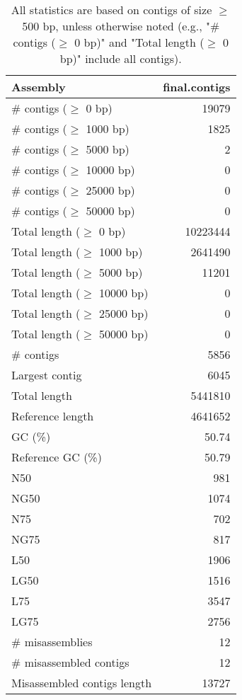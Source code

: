 \documentclass[12pt,a4paper]{article}
\begin{document}
\begin{table}[ht]
\begin{center}
\caption{All statistics are based on contigs of size $\geq$ 500 bp, unless otherwise noted (e.g., "\# contigs ($\geq$ 0 bp)" and "Total length ($\geq$ 0 bp)" include all contigs).}
\begin{tabular}{|l*{1}{|r}|}
\hline
Assembly & final.contigs \\ \hline
\# contigs ($\geq$ 0 bp) & 19079 \\ \hline
\# contigs ($\geq$ 1000 bp) & 1825 \\ \hline
\# contigs ($\geq$ 5000 bp) & 2 \\ \hline
\# contigs ($\geq$ 10000 bp) & 0 \\ \hline
\# contigs ($\geq$ 25000 bp) & 0 \\ \hline
\# contigs ($\geq$ 50000 bp) & 0 \\ \hline
Total length ($\geq$ 0 bp) & 10223444 \\ \hline
Total length ($\geq$ 1000 bp) & 2641490 \\ \hline
Total length ($\geq$ 5000 bp) & 11201 \\ \hline
Total length ($\geq$ 10000 bp) & 0 \\ \hline
Total length ($\geq$ 25000 bp) & 0 \\ \hline
Total length ($\geq$ 50000 bp) & 0 \\ \hline
\# contigs & 5856 \\ \hline
Largest contig & 6045 \\ \hline
Total length & 5441810 \\ \hline
Reference length & 4641652 \\ \hline
GC (\%) & 50.74 \\ \hline
Reference GC (\%) & 50.79 \\ \hline
N50 & 981 \\ \hline
NG50 & 1074 \\ \hline
N75 & 702 \\ \hline
NG75 & 817 \\ \hline
L50 & 1906 \\ \hline
LG50 & 1516 \\ \hline
L75 & 3547 \\ \hline
LG75 & 2756 \\ \hline
\# misassemblies & 12 \\ \hline
\# misassembled contigs & 12 \\ \hline
Misassembled contigs length & 13727 \\ \hline

\end{tabular}
\end{center}
\end{table}
\end{document}
